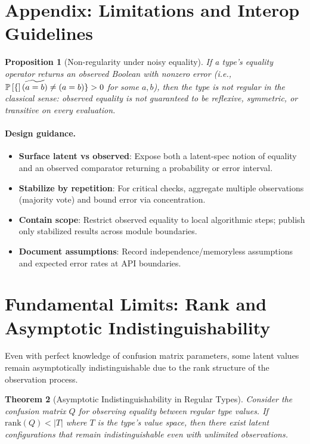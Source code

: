 \documentclass[11pt,final,hidelinks]{article}
\newtheorem{theorem}{Theorem}[section]
\newtheorem{proposition}[theorem]{Proposition}
\begin{document}
{\section{Appendix: Limitations and Interop Guidelines}

\begin{proposition}[Non-regularity under noisy equality]
If a type's equality operator returns an observed Boolean with nonzero error (i.e., $\mathbb{P}\left[\{\right]\widetilde{(a=b)}\neq (a=b)\}>0$ for some $a,b$), then the type is not regular in the classical sense: observed equality is not guaranteed to be reflexive, symmetric, or transitive on every evaluation.
\end{proposition}

\paragraph{Design guidance.}
\begin{itemize}
  \item \textbf{Surface latent vs observed}: Expose both a latent-spec notion of equality and an observed comparator returning a probability or error interval.
  \item \textbf{Stabilize by repetition}: For critical checks, aggregate multiple observations (majority vote) and bound error via concentration.
  \item \textbf{Contain scope}: Restrict observed equality to local algorithmic steps; publish only stabilized results across module boundaries.
  \item \textbf{Document assumptions}: Record independence/memoryless assumptions and expected error rates at API boundaries.
\end{itemize}

\section{Fundamental Limits: Rank and Asymptotic Indistinguishability}

Even with perfect knowledge of confusion matrix parameters, some latent values remain asymptotically indistinguishable due to the rank structure of the observation process.

\begin{theorem}[Asymptotic Indistinguishability in Regular Types]
Consider the confusion matrix $Q$ for observing equality between regular type values. If $\text{rank}(Q) < |T|$ where $T$ is the type's value space, then there exist latent configurations that remain indistinguishable even with unlimited observations.
\end{theorem}

}
\end{document}

